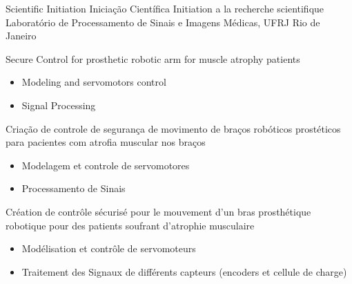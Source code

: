 \cventry{\aug\ 2015 \newline \jun\ 2016\newline}
{
  \ml
  {Scientific Initiation}
  {Iniciação Científica}
  {Initiation a la recherche scientifique}}
{\newline Laboratório de Processamento de Sinais e Imagens Médicas, UFRJ}
{\newline Rio de Janeiro}
{\brazil}
{
  \ml
  { Secure Control for prosthetic robotic arm for muscle atrophy
    patients
    \begin{itemize}
      \item Modeling and servomotors control
      \item Signal Processing
    \end{itemize}
  }
  {
    Criação de controle de segurança de movimento de braços robóticos prostéticos para
    pacientes com atrofia muscular nos braços
    \begin{itemize}
      \item Modelagem et controle de servomotores
      \item Processamento de Sinais
    \end{itemize}
  }
  { Création de contrôle sécurisé pour le mouvement d'un bras prosthétique
    robotique pour des patients soufrant d'atrophie musculaire
    \begin{itemize}
      \item Modélisation et contrôle de servomoteurs
      \item Traitement des Signaux de différents capteurs (encoders et cellule de charge)
    \end{itemize}
  }
}


